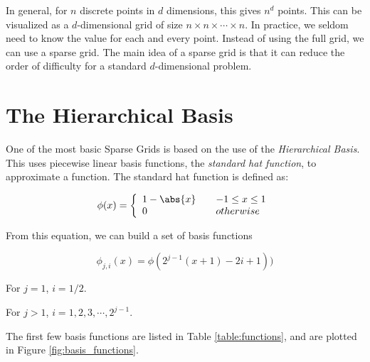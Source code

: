 In general, for $n$ discrete points in $d$ dimensions, this gives $n^d$ points.  This can be visualized as a $d$-dimensional grid of size $n \times n \times \cdots \times n$. In practice, we seldom need to know the value for each and every point.  Instead of using the full grid, we can use a sparse grid.  The main idea of a sparse grid is that it can reduce the order of difficulty for a standard $d$-dimensional problem.

\section*{The Hierarchical Basis}
One of the most basic Sparse Grids is based on the use of the \emph{Hierarchical Basis}.  This uses piecewise linear basis functions, the \emph{standard hat function}, to approximate a function.  The standard hat function is defined as:

\begin{equation}
\phi(x) = \left\{
        \begin{array}{ll}
            1-\abs{x} & \quad -1 \leq x \leq 1 \\
            0 & \quad otherwise
        \end{array}
    \right.
\end{equation}

From this equation, we can build a set of basis functions

\begin{equation}
\phi_{j,i}(x) = \phi(2^{j-1}(x+1) - 2i+1))
\end{equation}

\begin{center}
For $j=1$, $i=1/2$.
\end{center}
\begin{center}
For $j>1$, $i=1,2,3,\cdots,2^{j-1}$.  
\end{center}

The first few basis functions are listed in Table \ref{table:functions}, and are plotted in Figure \ref{fig:basis_functions}.

